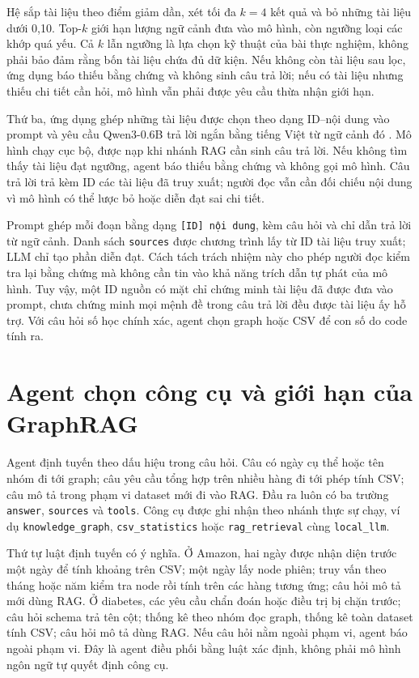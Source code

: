 \documentclass[12pt,a4paper]{report}
\begin{document}
Hệ sắp tài liệu theo điểm giảm dần, xét tối đa $k=4$ kết quả và bỏ những tài liệu dưới 0,10. Top-$k$ giới hạn lượng ngữ cảnh đưa vào mô hình, còn ngưỡng loại các khớp quá yếu. Cả $k$ lẫn ngưỡng là lựa chọn kỹ thuật của bài thực nghiệm, không phải bảo đảm rằng bốn tài liệu chứa đủ dữ kiện. Nếu không còn tài liệu sau lọc, ứng dụng báo thiếu bằng chứng và không sinh câu trả lời; nếu có tài liệu nhưng thiếu chi tiết cần hỏi, mô hình vẫn phải được yêu cầu thừa nhận giới hạn.

Thứ ba, ứng dụng ghép những tài liệu được chọn theo dạng ID--nội dung vào prompt và yêu cầu
Qwen3-0.6B trả lời ngắn bằng tiếng Việt từ ngữ cảnh đó \cite{essay03-qwen}. Mô hình chạy cục bộ,
được nạp khi nhánh RAG cần sinh câu trả lời. Nếu không tìm thấy tài liệu đạt ngưỡng, agent báo thiếu
bằng chứng và không gọi mô hình. Câu trả lời trả kèm ID các tài liệu đã truy xuất; người đọc vẫn cần
đối chiếu nội dung vì mô hình có thể lược bỏ hoặc diễn đạt sai chi tiết.

Prompt ghép mỗi đoạn bằng dạng \texttt{[ID] nội dung}, kèm câu hỏi và chỉ dẫn trả lời từ ngữ cảnh. Danh sách \texttt{sources} được chương trình lấy từ ID tài liệu truy xuất; LLM chỉ tạo phần diễn đạt. Cách tách trách nhiệm này cho phép người đọc kiểm tra lại bằng chứng mà không cần tin vào khả năng trích dẫn tự phát của mô hình. Tuy vậy, một ID nguồn có mặt chỉ chứng minh tài liệu đã được đưa vào prompt, chưa chứng minh mọi mệnh đề trong câu trả lời đều được tài liệu ấy hỗ trợ. Với câu hỏi số học chính xác, agent chọn graph hoặc CSV để con số do code tính ra.

\section{Agent chọn công cụ và giới hạn của GraphRAG}
Agent định tuyến theo dấu hiệu trong câu hỏi. Câu có ngày cụ thể hoặc tên nhóm đi tới graph;
câu yêu cầu tổng hợp trên nhiều hàng đi tới phép tính CSV; câu mô tả trong phạm vi dataset mới
đi vào RAG. Đầu ra luôn có ba trường \texttt{answer}, \texttt{sources} và \texttt{tools}. Công cụ
được ghi nhận theo nhánh thực sự chạy, ví dụ \texttt{knowledge\_graph},
\texttt{csv\_statistics} hoặc \texttt{rag\_retrieval} cùng \texttt{local\_llm}.

Thứ tự luật định tuyến có ý nghĩa. Ở Amazon, hai ngày được nhận diện trước một ngày để tính khoảng trên CSV; một ngày lấy node phiên; truy vấn theo tháng hoặc năm kiểm tra node rồi tính trên các hàng tương ứng; câu hỏi mô tả mới dùng RAG. Ở diabetes, các yêu cầu chẩn đoán hoặc điều trị bị chặn trước; câu hỏi schema trả tên cột; thống kê theo nhóm đọc graph, thống kê toàn dataset tính CSV; câu hỏi mô tả dùng RAG. Nếu câu hỏi nằm ngoài phạm vi, agent báo ngoài phạm vi. Đây là agent điều phối bằng luật xác định, không phải mô hình ngôn ngữ tự quyết định công cụ.
\end{document}
